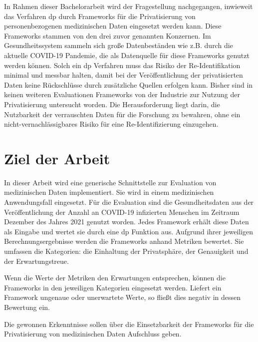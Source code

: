 In Rahmen dieser Bachelorarbeit wird der Fragestellung nachgegangen, inwieweit das Verfahren \gls{dp} durch Frameworks für die Privatisierung von personenbezogenen medizinischen Daten eingesetzt werden kann. Diese Frameworks stammen von den drei zuvor genannten Konzernen. Im Gesundheitssystem sammeln sich große Datenbeständen wie z.B. durch die aktuelle COVID-19 Pandemie, die als Datenquelle für diese Frameworks genutzt werden können. Solch ein \gls{dp} Verfahren muss das Risiko der Re-Identifikation minimal und messbar halten, damit bei der Veröffentlichung der privatisierten Daten keine Rückschlüsse durch zusätzliche Quellen erfolgen kann. Bisher sind in keinen weiteren Evaluationen Frameworks von der Industrie zur Nutzung der Privatisierung untersucht worden. Die Herausforderung liegt darin, die Nutzbarkeit der verrauschten Daten für die Forschung zu bewahren, ohne ein nicht-vernachlässigbares Risiko für eine Re-Identifizierung einzugehen.

\section{Ziel der Arbeit}
In dieser Arbeit wird eine generische Schnittstelle zur Evaluation von medizinischen Daten implementiert. Sie wird in einem medizinischen Anwendungsfall eingesetzt. Für die Evaluation sind die Gesundheitsdaten aus der Veröffentlichung der Anzahl an COVID-19 infizierten Menschen im Zeitraum Dezember des Jahres 2021 genutzt worden. Jedes Framework erhält diese Daten als Eingabe und wertet sie durch eine \gls{dp} Funktion aus. Aufgrund ihrer jeweiligen Berechnungsergebnisse werden die Frameworks anhand Metriken bewertet. Sie umfassen die Kategorien: die Einhaltung der Privatsphäre, der Genauigkeit und der Erwartungstreue.

Wenn die Werte der Metriken den Erwartungen entsprechen, können die Frameworks in den jeweiligen Kategorien eingesetzt werden. Liefert ein Framework ungenaue oder unerwartete Werte, so fließt dies negativ in dessen Bewertung ein.

Die gewonnen Erkenntnisse sollen über die Einsetzbarkeit der Frameworks für die Privatisierung von medizinischen Daten Aufschluss geben.

